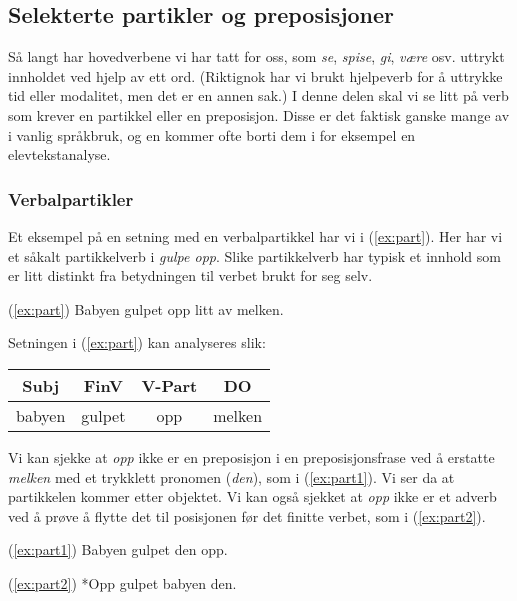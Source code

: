 \documentclass{article}
\begin{document}
\subsection{Selekterte partikler og preposisjoner}

S{\aa} langt har hovedverbene vi har tatt for oss, som {\it se}, {\it spise}, {\it gi}, {\it v{\ae}re} osv. uttrykt innholdet ved hjelp av ett ord. (Riktignok har vi brukt hjelpeverb for {\aa} uttrykke tid eller modalitet, men det er en annen sak.) I denne delen skal vi se litt p{\aa} verb som krever en partikkel eller en preposisjon. Disse er det faktisk ganske mange av i vanlig spr{\aa}kbruk, og en kommer ofte borti dem i for eksempel en elevtekstanalyse. 

\subsubsection{Verbalpartikler}

Et eksempel p{\aa} en setning med en verbalpartikkel har vi i (\ref{ex:part}). Her har vi et s{\aa}kalt partikkelverb i {\it gulpe opp}. Slike partikkelverb har typisk et innhold som er litt distinkt fra betydningen til verbet brukt for seg selv.

\begin{exe} 
\ex\label{ex:part} (\ref{ex:part}) Babyen gulpet opp litt av melken.
\end{exe}

Setningen i (\ref{ex:part}) kan analyseres slik:

\begin{table}[!ht]
\begin{tabular}{|c|c|c|c|}
\hline
Subj & FinV & V-Part & DO\\\hline
babyen & gulpet & opp & melken\\\hline
\end{tabular}
\end{table}

Vi kan sjekke at {\it opp} ikke er en preposisjon i en preposisjonsfrase ved {\aa} erstatte {\it melken} med et trykklett pronomen ({\it den}), som i (\ref{ex:part1}). Vi ser da at partikkelen kommer etter objektet. Vi kan ogs{\aa} sjekket at {\it opp} ikke er et adverb ved {\aa} pr{\o}ve {\aa} flytte det til posisjonen f{\o}r det finitte verbet, som i (\ref{ex:part2}).

\begin{exe} 
\ex
\begin{xlist}
\ex\label{ex:part1} (\ref{ex:part1}) Babyen gulpet den opp.

\ex\label{ex:part2} (\ref{ex:part2}) *Opp gulpet babyen den.
\end{xlist}
\end{exe}
\end{document}
